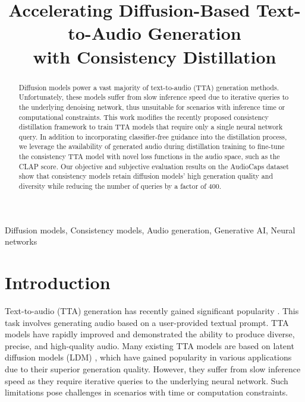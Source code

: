 \documentclass{article}
\title{Accelerating Diffusion-Based Text-to-Audio Generation\\with Consistency Distillation}
\begin{document}
\ninept  


\maketitle


\begin{abstract}
Diffusion models power a vast majority of text-to-audio (TTA) generation methods. Unfortunately, these models suffer from slow inference speed due to iterative queries to the underlying denoising network, thus unsuitable for scenarios with inference time or computational constraints. This work modifies the recently proposed consistency distillation framework to train TTA models that require only a single neural network query. In addition to incorporating classifier-free guidance into the distillation process, we leverage the availability of generated audio during distillation training to fine-tune the consistency TTA model with novel loss functions in the audio space, such as the CLAP score. Our objective and subjective evaluation results on the AudioCaps dataset show that consistency models retain diffusion models' high generation quality and diversity while reducing the number of queries by a factor of 400.
\end{abstract}


\begin{keywords}
Diffusion models, Consistency models, Audio generation, Generative AI, Neural networks
\end{keywords}



\section{Introduction} \label{sec:intro}

Text-to-audio (TTA) generation has recently gained significant popularity \cite{tango, diffsound, audioldm, audioldm-2, make-an-audio, make-an-audio-2, codi, audiogen, riffusion}. This task involves generating audio based on a user-provided textual prompt. TTA models have rapidly improved and demonstrated the ability to produce diverse, precise, and high-quality audio. Many existing TTA models are based on latent diffusion models (LDM) \cite{ldm}, which have gained popularity in various applications due to their superior generation quality. However, they suffer from slow inference speed as they require iterative queries to the underlying neural network. Such limitations pose challenges in scenarios with time or computation constraints.
\end{document}
